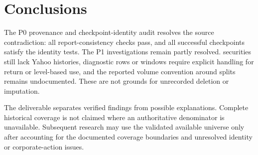 \section{Conclusions}


The P0 provenance and checkpoint-identity audit resolves the source
contradiction: all \ConsistencyChecksPassed{} report-consistency checks pass,
and all \IdentityValid{} successful checkpoints satisfy the identity tests.
The P1 investigations remain partly resolved. \UnavailableSecurities{}
securities still lack Yahoo histories, \QuarantineRows{} diagnostic rows or
windows require explicit handling for return or level-based use, and the
reported volume convention around splits remains undocumented. These are not
grounds for unrecorded deletion or imputation.

The deliverable separates verified findings from possible explanations.
Complete historical coverage is not claimed where an authoritative denominator
is unavailable. Subsequent research may use the validated available universe
only after accounting for the documented coverage boundaries and unresolved
identity or corporate-action issues.
